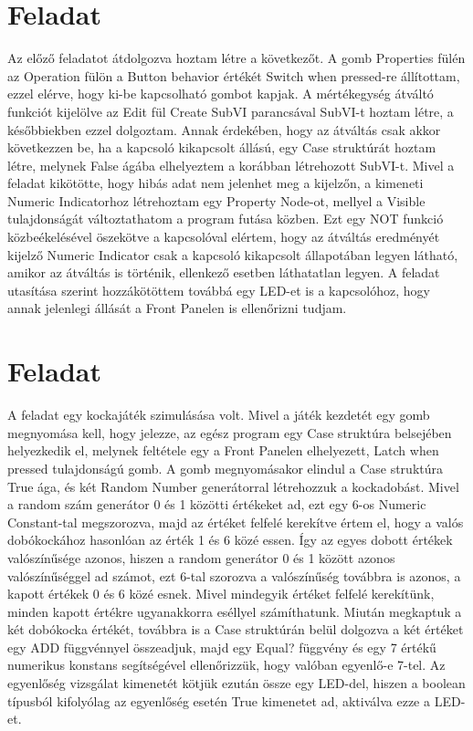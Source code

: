 \documentclass[10pt, conference,a4paper]{ITKproc}
\begin{document}
\section{Feladat}
Az előző feladatot átdolgozva hoztam létre a következőt. A gomb Properties fülén az Operation fülön a Button behavior értékét Switch when pressed-re állítottam, ezzel elérve, hogy ki-be kapcsolható gombot kapjak. A mértékegység átváltó funkciót kijelölve az Edit fül Create SubVI parancsával SubVI-t hoztam létre, a későbbiekben ezzel dolgoztam. Annak érdekében, hogy az átváltás csak akkor következzen be, ha a kapcsoló kikapcsolt állású, egy Case struktúrát hoztam létre, melynek False ágába elhelyeztem a korábban létrehozott SubVI-t. Mivel a feladat kikötötte, hogy hibás adat nem jelenhet meg a kijelzőn, a kimeneti Numeric Indicatorhoz létrehoztam egy Property Node-ot, mellyel a Visible tulajdonságát változtathatom a program futása közben. Ezt egy NOT funkció közbeékelésével öszekötve a kapcsolóval elértem, hogy az átváltás eredményét kijelző Numeric Indicator csak a kapcsoló kikapcsolt állapotában legyen látható, amikor az átváltás is történik, ellenkező esetben láthatatlan legyen. A feladat utasítása szerint hozzákötöttem továbbá egy LED-et is a kapcsolóhoz, hogy annak jelenlegi állását a Front Panelen is ellenőrizni tudjam. 
\section{Feladat}
A feladat egy kockajáték szimulásása volt. Mivel a játék kezdetét egy gomb megnyomása kell, hogy jelezze, az egész program egy Case struktúra belsejében helyezkedik el, melynek feltétele egy a Front Panelen elhelyezett, Latch when pressed tulajdonságú gomb. A gomb megnyomásakor elindul a Case struktúra True ága, és két Random Number generátorral létrehozzuk a kockadobást. Mivel a random szám generátor 0 és 1 közötti értékeket ad, ezt egy 6-os Numeric Constant-tal megszorozva, majd az értéket felfelé kerekítve értem el, hogy a valós dobókockához hasonlóan az érték 1 és 6 közé essen. Így az egyes dobott értékek valószínűsége azonos, hiszen a random generátor 0 és 1 között azonos valószínűséggel ad számot, ezt 6-tal szorozva a valószínűség továbbra is azonos, a kapott értékek 0 és 6 közé esnek. Mivel mindegyik értéket felfelé kerekítünk, minden kapott értékre ugyanakkorra eséllyel számíthatunk. Miután megkaptuk a két dobókocka értékét, továbbra is a Case struktúrán belül dolgozva a két értéket egy ADD függvénnyel összeadjuk, majd egy Equal? függvény és egy 7 értékű numerikus konstans segítségével ellenőrizzük, hogy valóban egyenlő-e 7-tel. Az egyenlőség vizsgálat kimenetét kötjük ezután össze egy LED-del, hiszen a boolean típusból kifolyólag az egyenlőség esetén True kimenetet ad, aktiválva ezze a LED-et. 
\end{document}
